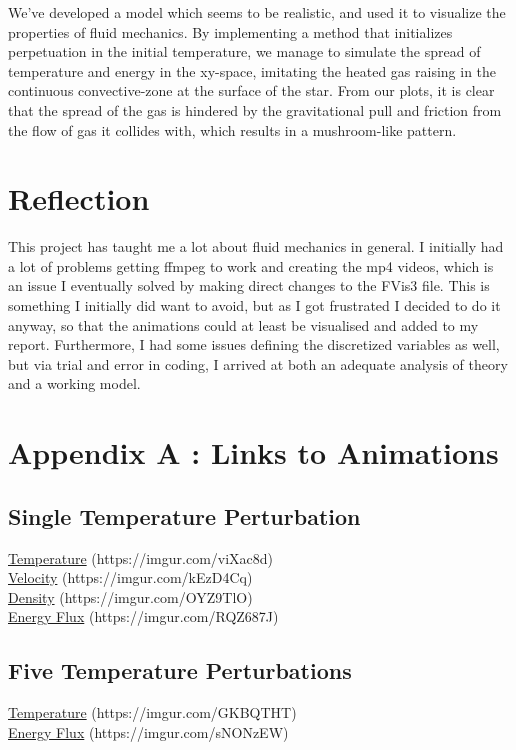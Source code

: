 \documentclass[10pt, nofootinbib, twocolumn]{revtex4-1}
\begin{document}
We've developed a model which seems to be realistic, and used it to visualize the properties of fluid mechanics. By implementing a method that initializes perpetuation in the initial temperature, we manage to simulate the spread of temperature and energy in the xy-space, imitating the heated gas raising in the continuous convective-zone at the surface of the star. From our plots, it is clear that the spread of the gas is hindered by the gravitational pull and friction from the flow of gas it collides with, which results in a mushroom-like pattern.



\section{Reflection}
This project has taught me a lot about fluid mechanics in general. I initially had a lot of problems getting ffmpeg to work and creating the mp4 videos, which is an issue I eventually solved by making direct changes to the FVis3 file. This is something I initially did want to avoid, but as I got frustrated I decided to do it anyway, so that the animations could at least be visualised and added to my report. Furthermore, I had some issues defining the discretized variables as well, but via trial and error in coding, I arrived at both an adequate analysis of theory and a working model. 


\section{Appendix A : Links to Animations}\label{sec:appendix_A}
\subsection{Single Temperature Perturbation}
\href{https://imgur.com/viXac8d}{Temperature}\label{gif:single_temperature} (https://imgur.com/viXac8d)\\
\href{https://imgur.com/kEzD4Cq}{Velocity}\label{gif:single_velocity} (https://imgur.com/kEzD4Cq)\\
\href{https://imgur.com/OYZ9TlO}{Density}\label{gif:single_density} (https://imgur.com/OYZ9TlO)\\
\href{https://imgur.com/RQZ687J}{Energy Flux}\label{gif:single_energy} (https://imgur.com/RQZ687J)\\
\subsection{Five Temperature Perturbations}
\href{https://imgur.com/GKBQTHT}{Temperature}\label{gif:five_temperature} (https://imgur.com/GKBQTHT)\\
\href{https://imgur.com/sNONzEW}{Energy Flux}\label{gif:five_energy} (https://imgur.com/sNONzEW)\\




\end{document}
